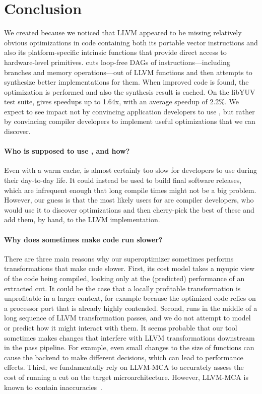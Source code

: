 \section{Conclusion}
\label{sec:conc}

We created \minotaur{} because we noticed that LLVM appeared to be missing
relatively obvious optimizations in code containing both its portable
vector instructions and also its platform-specific intrinsic
functions that provide direct access to hardware-level primitives.
%
\minotaur{} cuts loop-free DAGs of instructions---including branches and
memory operations---out of LLVM functions and then attempts to
synthesize better implementations for them.
%
When improved code is found, the optimization is performed and also
the synthesis result is cached.
%
On the libYUV test suite, \minotaur{} gives speedups up to 1.64x,
with an average speedup of 2.2\%.
%
We expect to see impact not by convincing application developers to
use \minotaur, but rather by convincing compiler developers to implement
useful optimizations that we can discover.




\iffalse
\paragraph{Who is supposed to use \minotaur{}, and how?}
%
Even with a warm cache, \minotaur{} is almost certainly too slow for
developers to use during their day-to-day life.
%
It could instead be used to build final software releases, which are
infrequent enough that long compile times might not be a big problem.
%
However, our guess is that the most likely users for \minotaur{} are
compiler developers, who would use it to discover optimizations and
then cherry-pick the best of these and add them, by hand, to the LLVM
implementation.


\paragraph{Why does \minotaur{} sometimes make code run slower?}
%
There are three main reasons why our
superoptimizer sometimes performs transformations that make code
slower.
%
First, its cost model takes a myopic view of the code being compiled,
looking only at the (predicted) performance of an extracted cut.
%
It could be the case that a locally profitable transformation is
unprofitable in a larger context, for example because the optimized
code relies on a processor port that is already highly contended.
%
Second, \minotaur{} runs in the middle of a long sequence of LLVM
transformation passes, and we do not attempt to model or predict how it
might interact with them.
%
It seems probable that our tool sometimes makes changes that interfere
with LLVM transformations downstream in the pass pipeline.
%
For example, even small changes to the size of functions can cause the
backend to make different decisions, which can lead to performance effects.
%
Third, we fundamentally rely on LLVM-MCA to accurately assess the cost
of running a cut on the target microarchitecture.
%
However, LLVM-MCA is known to contain inaccuracies~\cite{ithemal}.



